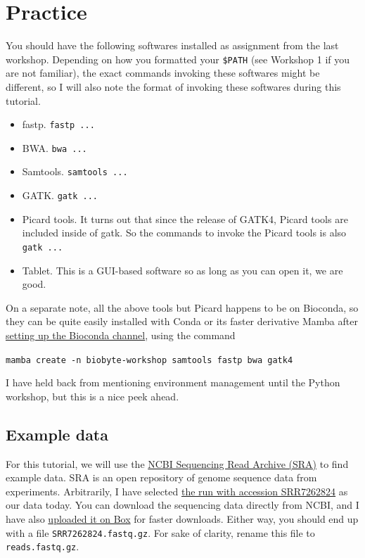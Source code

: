 \documentclass[12pt,letterpaper]{article}
\begin{document}
\section{Practice}

You should have the following softwares installed as assignment from the last workshop. Depending on how you formatted your \texttt{\$PATH} (see Workshop 1 if you are not familiar), the exact commands invoking these softwares might be different, so I will also note the format of invoking these softwares during this tutorial.

\begin{itemize}
   \item fastp. \texttt{fastp ...}
   \item BWA. \texttt{bwa ...}
   \item Samtools. \texttt{samtools ...}
   \item GATK. \texttt{gatk ...}
   \item Picard tools. It turns out that since the release of GATK4, Picard tools are included inside of gatk. So the commands to invoke the Picard tools is also \texttt{gatk ...}
   \item Tablet. This is a GUI-based software so as long as you can open it, we are good.
\end{itemize}

On a separate note, all the above tools but Picard happens to be on Bioconda, so they can be quite easily installed with Conda or its faster derivative Mamba after \href{https://bioconda.github.io/}{setting up the Bioconda channel}, using the command

\texttt{mamba create -n biobyte-workshop samtools fastp bwa gatk4}

I have held back from mentioning environment management until the Python workshop, but this is a nice peek ahead.


\subsection{Example data}

For this tutorial, we will use the \href{https://www.ncbi.nlm.nih.gov/sra}{NCBI Sequencing Read Archive (SRA)} to find example data. SRA is an open repository of genome sequence data from experiments. Arbitrarily, I have selected \href{https://www.ncbi.nlm.nih.gov/sra/SRR7262824}{the run with accession SRR7262824} as our data today. You can download the sequencing data directly from NCBI, and I have also \href{https://duke.box.com/s/jtu2wv1agbo2kp60z0k1mt9oos9b8v1k}{uploaded it on Box} for faster downloads. Either way, you should end up with a file \texttt{SRR7262824.fastq.gz}. For sake of clarity, rename this file to \texttt{reads.fastq.gz}.
\end{document}

